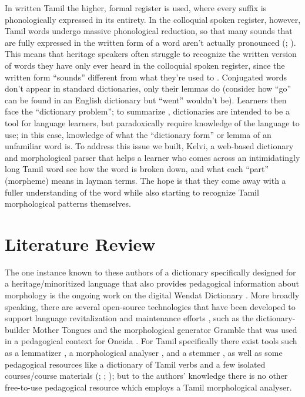 \documentclass[11pt]{article}
\begin{document}
In written Tamil the higher, formal register is used, where every suffix is phonologically expressed in its entirety. 
In the colloquial spoken register, however, Tamil words undergo massive phonological reduction, 
so that many sounds that are fully expressed in the written form of a word aren’t actually pronounced (\citealp{annamalai_modern_2019}; \citealp{renganathan_heritage_2019}). 
This means that heritage speakers often struggle to recognize the written version of words they have only ever heard in the colloquial spoken register, 
since the written form “sounds” different from what they’re used to \citep{renganathan_heritage_2019}. 
Conjugated words don’t appear in standard dictionaries, 
only their lemmas do (consider how “go” can be found in an English dictionary but “went” wouldn’t be). 
Learners then face the “dictionary problem”; to summarize \citet{littell_waldayu_2017}, 
dictionaries are intended to be a tool for language learners, but paradoxically require knowledge of the language to use; 
in this case, knowledge of what the “dictionary form” or lemma of an unfamiliar word is. 
To address this issue we built, Kelvi, a web-based dictionary and morphological parser that helps a learner who comes 
across an intimidatingly long Tamil word see how the word is broken down, and what each “part” (morpheme) means 
in layman terms. The hope is that they come away with a fuller understanding of the word while also starting to 
recognize Tamil morphological patterns themselves.

\section{Literature Review}
The one instance known to these authors of a dictionary specifically designed for a heritage/minoritized 
language that also provides pedagogical information about morphology is the ongoing work on the 
digital Wendat Dictionary \citep{lukaniec_modern_2023}. 
More broadly speaking, there are several open-source technologies that have been developed to 
support language revitalization and maintenance efforts \citep{brinklow_indigenous_nodate}, 
such as the dictionary-builder Mother Tongues \citep{littell_waldayu_2017} and the 
morphological generator Gramble \citep{littell_gramble_2024} that was used in a pedagogical context for Oneida \citep{lu-etal-2024-empowering}. 
For Tamil specifically there exist tools such as a lemmatizer \citep{qi2020stanza}, 
a morphological analyser \citep{sarveswaran_thamizhimorph_2021},  and a stemmer \citep{rajalingam_rdamodharantamil-stemmer_2025}, as well as some 
pedagogical resources like a dictionary of Tamil verbs \citep{schiffman_english_2009} and a few 
isolated courses/course materials (\citealp{annamalai_colloquial_2002}; \citealp{prasad_tamil_2025}; \citealp{cheran_learn_2001}); 
but to the authors' knowledge there is no other free-to-use pedagogical resource which employs a Tamil morphological analyser.
\end{document}
